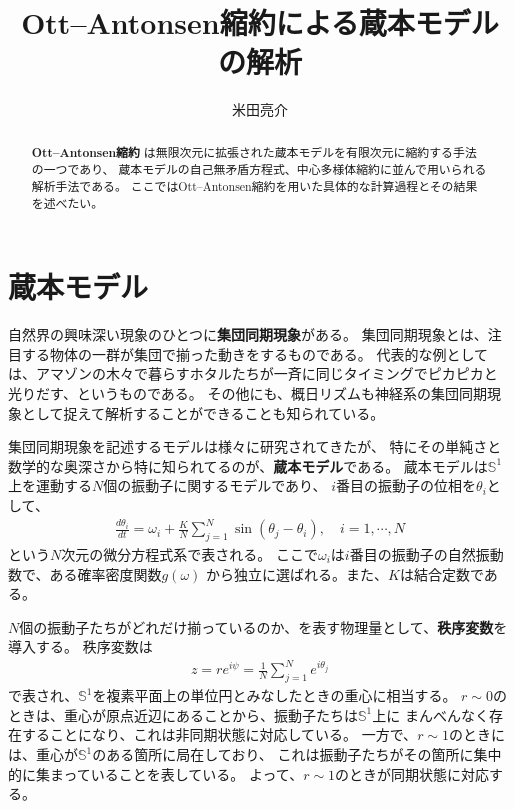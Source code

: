\documentclass{jsarticle}
\begin{document}
\title{Ott--Antonsen縮約による蔵本モデルの解析}
\author{米田亮介}
\maketitle	

\begin{abstract}
\textbf{Ott--Antonsen縮約}\cite{ott2008low,ott2009long}
は無限次元に拡張された蔵本モデルを有限次元に縮約する手法の一つであり、
蔵本モデルの自己無矛盾方程式、中心多様体縮約に並んで用いられる解析手法である。
ここではOtt--Antonsen縮約を用いた具体的な計算過程とその結果を述べたい。
\end{abstract}

\section{蔵本モデル}
自然界の興味深い現象のひとつに\textbf{集団同期現象}がある。
集団同期現象とは、注目する物体の一群が集団で揃った動きをするものである。
代表的な例としては、アマゾンの木々で暮らすホタルたちが一斉に同じタイミングでピカピカと
光りだす、というものである。
その他にも、概日リズムも神経系の集団同期現象として捉えて解析することができることも知られている。

集団同期現象を記述するモデルは様々に研究されてきたが、
特にその単純さと数学的な奥深さから特に知られてるのが、\textbf{蔵本モデル}である。
蔵本モデルは$\mathbb{S}^{1}$上を運動する$N$個の振動子に関するモデルであり、
$i$番目の振動子の位相を$\theta_{i}$として、
\begin{align}
\frac{d\theta_{i}}{dt}=\omega_{i}+\frac{K}{N}\sum_{j=1}^{N}\sin(\theta_{j}-\theta_{i}),\quad i=1,\cdots,N
\end{align}
という$N$次元の微分方程式系で表される。
ここで$\omega_{i}$は$i$番目の振動子の自然振動数で、ある確率密度関数$g(\omega)$
から独立に選ばれる。また、$K$は結合定数である。

$N$個の振動子たちがどれだけ揃っているのか、を表す物理量として、\textbf{秩序変数}を導入する。
秩序変数は
\begin{align}
z=re^{i\psi}=\frac{1}{N}\sum_{j=1}^{N}e^{i\theta_{j}}
\end{align}
で表され、$\mathbb{S}^{1}$を複素平面上の単位円とみなしたときの重心に相当する。
$r\sim0$のときは、重心が原点近辺にあることから、振動子たちは$\mathbb{S}^{1}$上に
まんべんなく存在することになり、これは非同期状態に対応している。
一方で、$r\sim1$のときには、重心が$\mathbb{S}^{1}$のある箇所に局在しており、
これは振動子たちがその箇所に集中的に集まっていることを表している。
よって、$r\sim1$のときが同期状態に対応する。
\end{document}
